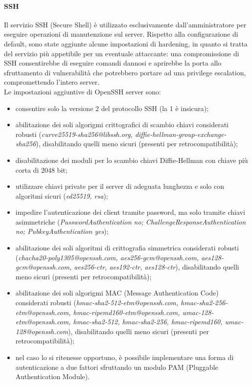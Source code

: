 \paragraph{SSH \label{ssh-server}}
Il servizio SSH (Secure Shell) è utilizzato esclusivamente dall'amministratore per eseguire operazioni di manutenzione sul server.
Rispetto alla configurazione di default, sono state aggiunte alcune impostazioni di hardening, in quanto si tratta del servizio più appetibile per un eventuale attaccante: una compromissione di SSH consentirebbe di eseguire comandi dannosi e aprirebbe la porta allo sfruttamento di vulnerabilità che potrebbero portare ad una privilege escalation, compromettendo l'intero server.
\\Le impostazioni aggiuntive di OpenSSH server sono:
\begin{itemize}
 \item consentire solo la versione 2 del protocollo SSH (la 1 è insicura);
 \item abilitazione dei soli algorigmi crittografici di scambio chiavi considerati robusti (\textit{curve25519-sha256@libssh.org, diffie-hellman-group-exchange-sha256}), disabilitando quelli meno sicuri (presenti per retrocompatibilità);
 \item disabilitazione dei moduli per lo scambio chiavi Diffie-Hellman con chiave più corta di 2048 bit;
 \item utilizzare chiavi private per il server di adeguata lunghezza e solo con algoritmi sicuri (\textit{ed25519, rsa});
 \item impedire l'autenticazione dei client tramite password, ma solo tramite chiavi asimmetriche (\textit{PasswordAuthentication no; ChallengeResponseAuthentication no; PubkeyAuthentication yes});
 \item abilitazione dei soli algoritmi di crittografia simmetrica considerati robusti (\textit{chacha20-poly1305@openssh.com, aes256-gcm@openssh.com, aes128-gcm@openssh.com, aes256-ctr, aes192-ctr, aes128-ctr}), disabilitando quelli meno sicuri (presenti per retrocompatibilità);
 \item abilitazione dei soli algorigmi MAC (Message Authentication Code) considerati robusti (\textit{hmac-sha2-512-etm@openssh.com, hmac-sha2-256-etm@openssh.com, hmac-ripemd160-etm@openssh.com, umac-128-\linebreak etm@openssh.com, hmac-sha2-512, hmac-sha2-256, hmac-ripemd160, umac-128@openssh.com}), disabilitando quelli meno sicuri (presenti per retrocompatibilità);
 \item nel caso lo si ritenesse opportuno, è possibile implementare una forma di autenticazione a due fattori sfruttando un modulo PAM (Pluggable Authentication Module).
\end{itemize}
